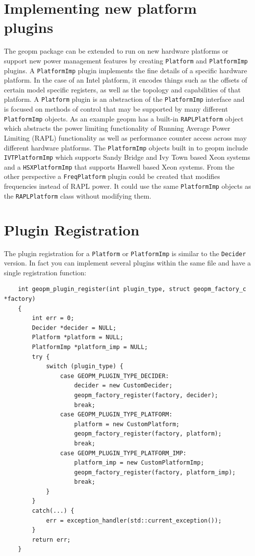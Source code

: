 \documentclass[11pt]{article}
\begin{document}
\section{Implementing new platform plugins}
The geopm package can be extended to run on new hardware platforms or
support new power management features by creating \verb#Platform# and
\verb#PlatformImp# plugins. A \verb#PlatformImp# plugin implements the
fine details of a specific hardware platform. In the case of an Intel
platform, it encodes things such as the offsets of certain model
specific registers, as well as the topology and capabilities of that
platform. A \verb#Platform# plugin is an abstraction of the
\verb#PlatformImp# interface and is focused on methods of control that
may be supported by many different \verb#PlatformImp# objects. As an
example geopm has a built-in \verb#RAPLPlatform# object which
abstracts the power limiting functionality of Running Average Power
Limiting (RAPL) functionality as well as performance counter access
across may different hardware platforms. The \verb#PlatformImp#
objects built in to geopm include \verb#IVTPlatformImp# which supports
Sandy Bridge and Ivy Town based Xeon systems and a
\verb#HSXPlatformImp# that supports Haswell based Xeon systems. From
the other perspective a \verb#FreqPlatform# plugin could be created
that modifies frequencies instead of RAPL power. It could use the same
\verb#PlatformImp# objects as the \verb#RAPLPlatform# class without
modifying them.
\section{Plugin Registration}
The plugin registration for a \verb#Platform# or \verb#PlatformImp# is
similar to the \verb#Decider# version. In fact you can implement
several plugins within the same file and have a single registration
function:
\begin{verbatim}
    int geopm_plugin_register(int plugin_type, struct geopm_factory_c *factory)
    {
        int err = 0;
        Decider *decider = NULL;
        Platform *platform = NULL;
        PlatformImp *platform_imp = NULL;
        try {
            switch (plugin_type) {
                case GEOPM_PLUGIN_TYPE_DECIDER:
                    decider = new CustomDecider;
                    geopm_factory_register(factory, decider);
                    break;
                case GEOPM_PLUGIN_TYPE_PLATFORM:
                    platform = new CustomPlatform;
                    geopm_factory_register(factory, platform);
                    break;
                case GEOPM_PLUGIN_TYPE_PLATFORM_IMP:
                    platform_imp = new CustomPlatformImp;
                    geopm_factory_register(factory, platform_imp);
                    break;
            }
        }
        catch(...) {
            err = exception_handler(std::current_exception());
        }
        return err;
    }
\end{verbatim}
\end{document}
